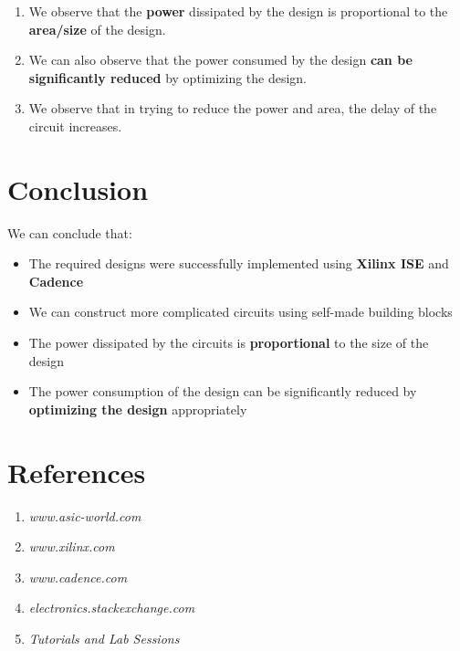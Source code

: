 \documentclass[a4paper,10pt]{report}
\begin{document}
\begin{enumerate}
	\item We observe that the \textbf{power} dissipated by the design is proportional to the \textbf{area/size} of the design.
	\item We can also observe that the power consumed by the design \textbf{can be significantly reduced} by optimizing the design.
	\item We observe that in trying to reduce the power and area, the delay of the circuit increases.
\end{enumerate}

\section{Conclusion}

We can conclude that:
\begin{itemize}
	\item The required designs were successfully implemented using \textbf{Xilinx ISE} and \textbf{Cadence}
	\item We can construct more complicated circuits using self-made building blocks
	\item The power dissipated by the circuits is \textbf{proportional} to the size of the design
	\item The power consumption of the design can be significantly reduced by \textbf{optimizing the design} appropriately
\end{itemize}

\section{References}
\begin{enumerate}
	\item \textit{www.asic-world.com}
	\item \textit{www.xilinx.com}
	\item \textit{www.cadence.com}
	\item \textit{electronics.stackexchange.com}
	\item \textit{Tutorials and Lab Sessions}
\end{enumerate}
\end{document}
